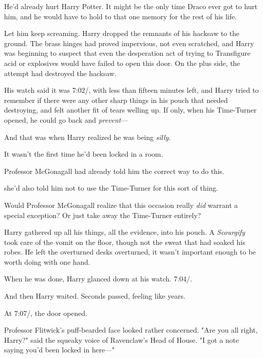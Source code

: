 He'd already hurt Harry Potter. It might be the only time Draco ever got to
hurt him, and he would have to hold to that one memory for the rest of his life.

Let him keep screaming.
\sbreak
Harry dropped the remnants of his hacksaw to the ground. The brass hinges had
proved impervious, not even scratched, and Harry was beginning to suspect that
even the desperation act of trying to Transfigure acid or explosives would have
failed to open this door. On the plus side, the attempt had destroyed the
hacksaw.

His watch said it was 7:02\PM/, with less than fifteen minutes left, and Harry
tried to remember if there were any other sharp things in his pouch that needed
destroying, and felt another fit of tears welling up. If only, when his
Time-Turner opened, he could go back and \emph{prevent}\mbox{---}

And that was when Harry realized he was being \emph{silly}.

It wasn't the first time he'd been locked in a room.

Professor McGonagall had already told him the correct way to do this.

{\el} she'd also told him not to use the Time-Turner for this sort of thing.

Would Professor McGonagall realize that this occasion really \emph{did} warrant
a special exception? Or just take away the Time-Turner entirely?

Harry gathered up all his things, all the evidence, into his pouch. A
\emph{Scourgify} took care of the vomit on the floor, though not the sweat that
had soaked his robes. He left the overturned desks overturned, it wasn't
important enough to be worth doing with one hand.

When he was done, Harry glanced down at his watch. 7:04\PM/.

And then Harry waited. Seconds passed, feeling like years.

At 7:07\PM/, the door opened.

Professor Flitwick's puff-bearded face looked rather concerned. "Are you all
right, Harry?" said the squeaky voice of Ravenclaw's Head of House. "I got a
note saying you'd been locked in here\mbox{---}"
